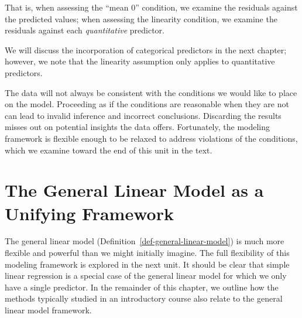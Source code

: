 \documentclass[
  letterpaper,
  DIV=11,
  numbers=noendperiod]{scrreprt}
\theoremstyle{definition}
\theoremstyle{definition}
\theoremstyle{remark}
\begin{document}
That is, when assessing the ``mean 0'' condition, we examine the
residuals against the predicted values; when assessing the linearity
condition, we examine the residuals against each \emph{quantitative}
predictor.

\begin{tcolorbox}[enhanced jigsaw, left=2mm, toprule=.15mm, arc=.35mm, breakable, opacitybacktitle=0.6, opacityback=0, rightrule=.15mm, colbacktitle=quarto-callout-note-color!10!white, coltitle=black, leftrule=.75mm, toptitle=1mm, colframe=quarto-callout-note-color-frame, titlerule=0mm, title=\textcolor{quarto-callout-note-color}{\faInfo}\hspace{0.5em}{Note}, bottomrule=.15mm, colback=white, bottomtitle=1mm]

We will discuss the incorporation of categorical predictors in the next
chapter; however, we note that the linearity assumption only applies to
quantitative predictors.

\end{tcolorbox}

The data will not always be consistent with the conditions we would like
to place on the model. Proceeding as if the conditions are reasonable
when they are not can lead to invalid inference and incorrect
conclusions. Discarding the results misses out on potential insights the
data offers. Fortunately, the modeling framework is flexible enough to
be relaxed to address violations of the conditions, which we examine
toward the end of this unit in the text.

\hypertarget{sec-glm-unifying-framework}{%
\chapter{The General Linear Model as a Unifying
Framework}\label{sec-glm-unifying-framework}}

\providecommand{\norm}[1]{\left\lVert#1\right\rVert}
\providecommand{\abs}[1]{\left\lvert#1\right\rvert}
\providecommand{\dist}[1]{\stackrel{\text{#1}}{\sim}}
\providecommand{\ind}[1]{\mathbb{I}\left(#1\right)}
\providecommand{\bm}[1]{\mathbf{#1}}
\providecommand{\bs}[1]{\boldsymbol{#1}}
\providecommand{\Ell}{\mathcal{L}}
\providecommand{\indep}{\perp\negthickspace\negmedspace\perp}

The general linear model (Definition~\ref{def-general-linear-model}) is
much more flexible and powerful than we might initially imagine. The
full flexibility of this modeling framework is explored in the next
unit. It should be clear that simple linear regression is a special case
of the general linear model for which we only have a single predictor.
In the remainder of this chapter, we outline how the methods typically
studied in an introductory course also relate to the general linear
model framework.
\end{document}
